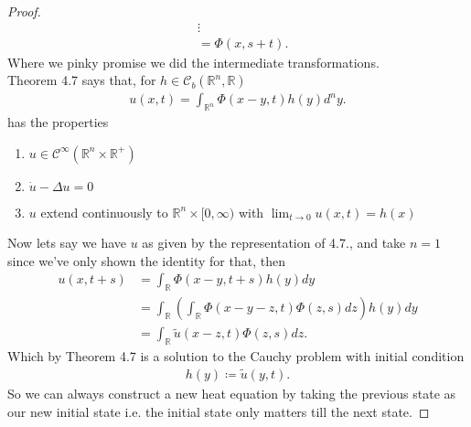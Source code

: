 \begin{proof}
\begin{align*}
                                            &\vdots\\
                                            &= \Phi(x,s+t)
  .\end{align*}
  Where we pinky promise we did the intermediate transformations. \\[1ex]
  Theorem 4.7 says that, for $h \in  \mathcal{C}_b(\mathbb{R}^{n},\mathbb{R} )$
  \begin{align*}
    u(x,t) = \int_{\mathbb{R}^{n} } \Phi(x-y,t)h(y) d^{n} y
  .\end{align*}
  has the properties 
  \begin{enumerate}
    \item $u \in  \mathcal{C}^{\infty}(\mathbb{R}^{n} \times  \mathbb{R}^{+}  ) $
    \item $\dot{u} - \Delta  u  = 0 $
    \item $u$ extend continuously to $\mathbb{R}^{n} \times  [0,\infty) $ with $\lim_{t \to 0} u(x,t) = h(x)$
  \end{enumerate}
  Now lets say we have $u$ as given by the representation of 4.7., and take $n=1$ since we've only shown the identity for that, then 
  \begin{align*}
    u(x,t+s) &= \int_{\mathbb{R} }\Phi(x-y,t+s)h(y) d y  \\
             &= \int_{\mathbb{R} }\left(\int_{\mathbb{R}} \Phi(x-y-z,t)\Phi(z,s) dz \right)h(y) d y\\
             &= \int_{\mathbb{R} }\tilde{u}(x-z,t)\Phi(z,s) d z
  .\end{align*}
Which by Theorem 4.7 is a solution to the Cauchy problem with initial condition
\begin{align*}
  h(y) \coloneqq \tilde{u}(y,t)  
.\end{align*}
So we can always construct a new heat equation by taking the previous state as our new initial state i.e. the initial state only matters till the next 
state.
\end{proof}
